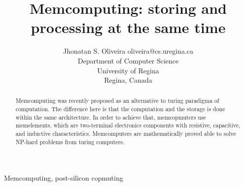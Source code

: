 \documentclass[twoside,11pt]{article}
\newcommand{\thistitle}{{Memcomputing: storing and processing at the same time}}
\begin{document}
\title{\thistitle}

\author{\name Jhonatan S. Oliveira \email oliveira@cs.uregina.ca \\
\addr Department of Computer Science \\
University of Regina \\ 
Regina, Canada
}


\maketitle

\begin{abstract}%
Memcomputing was recently proposed as an alternative to turing paradigma of computation.
The difference here is that the computation and the storage is done within the same architecture.
In order to achieve that, memcopmuters use memelements, which are two-terminal electronics components with resistive, capacitive, and inductive characteristics.
Memcomputers are mathematically proved able to solve NP-hard problems from turing computers.
\end{abstract}

\begin{keywords}
Memcomputing, post-silicon copmuting
\end{keywords}







\vskip 0.2in

\end{document}
